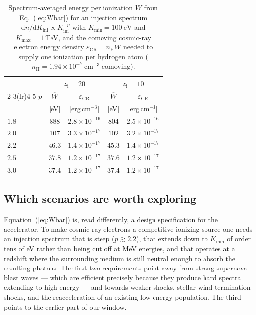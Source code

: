 \documentclass[twocolumn]{article}
\newcommand{\Kini}{K_{\mathrm{ini}}}
\newcommand{\zi}{z_{\mathrm{i}}}
\begin{document}
\begin{table}[t]
\centering
\caption{Spectrum-averaged energy per ionization $\overline{W}$ from
Eq.~(\ref{eq:Wbar}) for an injection spectrum
$\mathrm{d}n/\mathrm{d}\Kini \propto \Kini^{-p}$ with
$K_{\min} = 100\ \mathrm{eV}$ and $K_{\max} = 1\ \mathrm{TeV}$, and the
comoving cosmic-ray electron energy density $\varepsilon_{\mathrm{CR}} =
n_{\mathrm{H}}\overline{W}$ needed to supply one ionization per hydrogen atom
($n_{\mathrm{H}} = 1.94\times10^{-7}\ \mathrm{cm^{-3}}$ comoving).}
\label{tab:Wbar}
\small
\begin{tabular}{lcccc}
\toprule
 & \multicolumn{2}{c}{$\zi = 20$} & \multicolumn{2}{c}{$\zi = 10$} \\
\cmidrule(lr){2-3}\cmidrule(lr){4-5}
$p$ & $\overline{W}$ & $\varepsilon_{\mathrm{CR}}$
    & $\overline{W}$ & $\varepsilon_{\mathrm{CR}}$ \\
    & [eV] & [erg\,cm$^{-3}$] & [eV] & [erg\,cm$^{-3}$] \\
\midrule
$1.8$ & $888$  & $2.8\times10^{-16}$ & $804$  & $2.5\times10^{-16}$ \\
$2.0$ & $107$  & $3.3\times10^{-17}$ & $102$  & $3.2\times10^{-17}$ \\
$2.2$ & $46.3$ & $1.4\times10^{-17}$ & $45.3$ & $1.4\times10^{-17}$ \\
$2.5$ & $37.8$ & $1.2\times10^{-17}$ & $37.6$ & $1.2\times10^{-17}$ \\
$3.0$ & $37.4$ & $1.2\times10^{-17}$ & $37.4$ & $1.2\times10^{-17}$ \\
\bottomrule
\end{tabular}
\end{table}

\subsection{Which scenarios are worth exploring}
\label{sec:scenarios}

Equation~(\ref{eq:Wbar}) is, read differently, a design specification for the
accelerator. To make cosmic-ray electrons a competitive ionizing source one
needs an injection spectrum that is steep ($p \gtrsim 2.2$), that extends down
to $K_{\min}$ of order tens of eV rather than being cut off at MeV energies,
and that operates at a redshift where the surrounding medium is still neutral
enough to absorb the resulting photons. The first two requirements point away
from strong supernova blast waves --- which are efficient precisely because
they produce hard spectra extending to high energy --- and towards weaker
shocks, stellar wind termination shocks, and the reacceleration of an existing
low-energy population. The third points to the earlier part of our window.
\end{document}
